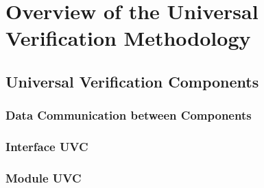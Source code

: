 \section{Overview of the Universal Verification Methodology}

\subsection{Universal Verification Components}

\subsubsection{Data Communication between Components}

\subsubsection{Interface UVC}

\subsubsection{Module UVC}